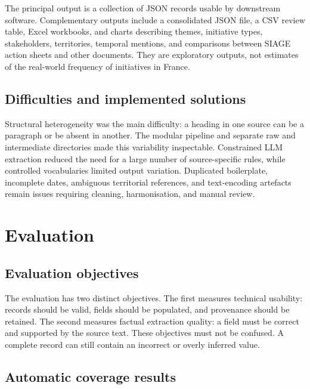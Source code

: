 The principal output is a collection of JSON records usable by downstream
software. Complementary outputs include a consolidated JSON file, a CSV review
table, Excel workbooks, and charts describing themes, initiative types,
stakeholders, territories, temporal mentions, and comparisons between SIAGE
action sheets and other documents. They are exploratory outputs, not estimates
of the real-world frequency of initiatives in France.

\section{Difficulties and implemented solutions}

Structural heterogeneity was the main difficulty: a heading in one source can
be a paragraph or be absent in another. The modular pipeline and separate raw
and intermediate directories made this variability inspectable. Constrained LLM
extraction reduced the need for a large number of source-specific rules, while
controlled vocabularies limited output variation. Duplicated boilerplate,
incomplete dates, ambiguous territorial references, and text-encoding artefacts
remain issues requiring cleaning, harmonisation, and manual review.

\chapter{Evaluation}

\section{Evaluation objectives}

The evaluation has two distinct objectives. The first measures technical
usability: records should be valid, fields should be populated, and provenance
should be retained. The second measures factual extraction quality: a field must
be correct and supported by the source text. These objectives must not be
confused. A complete record can still contain an incorrect or overly inferred
value.

\section{Automatic coverage results}

